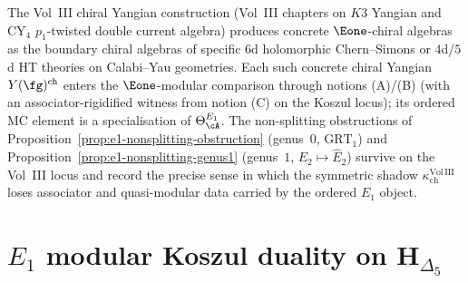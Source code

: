 \begin{remark}
\label{rem:e1-bridge-vol3}
The Vol~III chiral Yangian construction
\textup{(}Vol~III chapters on $K3$ Yangian and $\mathrm{CY}_4$
$p_1$-twisted double current algebra\textup{)} produces concrete
$\Eone$-chiral algebras as the boundary chiral algebras of
specific $6$d holomorphic Chern--Simons or $4$d/$5$d HT theories
on Calabi--Yau geometries. Each such concrete chiral Yangian
$Y(\fg)^{\mathrm{ch}}$ enters the $\Eone$-modular comparison through
notions \textup{(A)}/\textup{(B)} (with an associator-rigidified
witness from notion \textup{(C)} on the Koszul locus); its
ordered MC element is a specialisation of $\Theta_\cA^{E_1}$.
The non-splitting obstructions of
Proposition~\ref{prop:e1-nonsplitting-obstruction} (genus~$0$,
$\mathrm{GRT}_1$) and
Proposition~\ref{prop:e1-nonsplitting-genus1} (genus~$1$,
$E_2 \mapsto \widehat{E}_2$) survive on the Vol~III locus and
record the precise sense in which the symmetric shadow
$\kappa_{\mathrm{ch}}^{\mathrm{Vol\,III}}$ loses associator and
quasi-modular data carried by the ordered $E_1$ object.
\end{remark}

\section{$E_1$ modular Koszul duality on $\mathbf H_{\Delta_5}$}
\label{sec:e1mkd-supplement}

